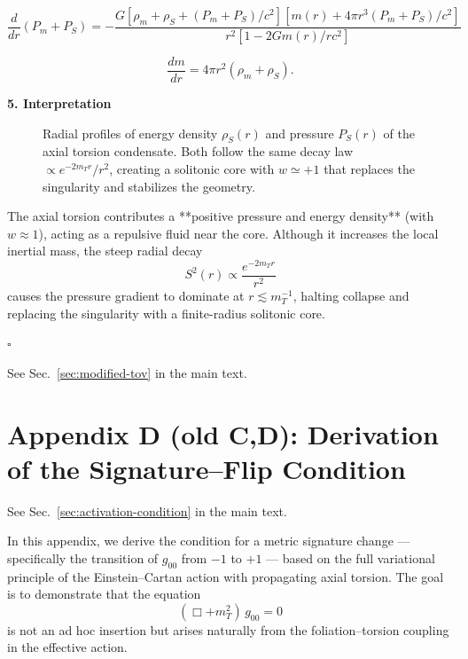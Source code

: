 \documentclass{article}
\begin{document}
\[
\boxed{
\frac{d}{dr}(P_m + P_S) =
-\frac{G \left[\rho_m + \rho_S + (P_m + P_S)/c^2 \right]
 \left[m(r) + 4\pi r^3 (P_m + P_S)/c^2 \right]}
 {r^2 \left[1 - 2Gm(r)/rc^2\right]}
}
\]

\[
\frac{dm}{dr} = 4\pi r^2 (\rho_m + \rho_S).
\]

\textbf{5. Interpretation}

\begin{figure}[h!]
\centering
\caption{Radial profiles of energy density $\rho_S(r)$ and pressure $P_S(r)$ of the axial torsion condensate. Both follow the same decay law $\propto e^{-2m_T r}/r^2$, creating a solitonic core with $w\simeq +1$ that replaces the singularity and stabilizes the geometry.}
\label{fig:torsion_profiles}
\end{figure}


The axial torsion contributes a **positive pressure and energy density** (with $w \approx 1$), acting as a repulsive fluid near the core. Although it increases the local inertial mass, the steep radial decay
\[
S^2(r) \propto \frac{e^{-2m_T r}}{r^2}
\]
causes the pressure gradient to dominate at $r \lesssim m_T^{-1}$, halting collapse and replacing the singularity with a finite-radius solitonic core.

\hfill$\square$




\label{app:tov-derivation}
See Sec.~\ref{sec:modified-tov} in the main text.




\section*{Appendix D (old C,D): Derivation of the Signature–Flip Condition}

\label{app:signature-derivation}
See Sec.~\ref{sec:activation-condition} in the main text.



In this appendix, we derive the condition for a metric signature change — specifically the transition of $g_{00}$ from $-1$ to $+1$ — based on the full variational principle of the Einstein–Cartan action with propagating axial torsion. The goal is to demonstrate that the equation
\[
(\Box + m_T^2)\, g_{00} = 0
\]
is not an ad hoc insertion but arises naturally from the foliation–torsion coupling in the effective action.
\end{document}
